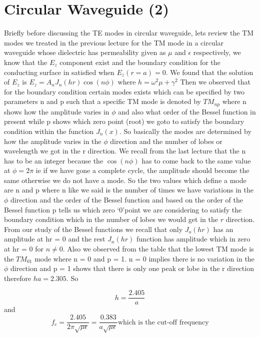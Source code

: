\chapter{Circular Waveguide (2)}\label{lec:lec45}
Briefly  before  discussing the TE modes in circular waveguide, lets review the TM modes we treated in the previous lecture for the TM   mode in a circular waveguide whose dielectric has permeability given as $\mu$ and $\epsilon$ respectively, we know that the $E_z$ component exist and the boundary condition for the conducting surface in satisfied when $E_z(r=a)= 0$. We found that the solution of $E_z$ is $E_z = A_n J_n(hr)\cos(n\phi)$  where $h= \omega^2\mu + \gamma^2$  Then we observed that for the boundary condition certain modes exists which can be specified by two parameters n and p such that a specific TM mode is denoted by $TM_{np}$ where n shows how the amplitude varies in $\phi$ and also what order of the Bessel function in present while p shows which zero point (root) we goto to satisfy the boundary condition within the function $J_n(x)$. So  basically the modes are determined by how the amplitude varies in the $\phi$ direction and the number of lobes or wavelength we got in the r direction. We recall from  the last lecture that the n has to be an integer because the $\cos(n\phi)$ has to come back to the same value at $\phi=2\pi$ ie if we have gone a complete cycle, the amplitude should become the same otherwise we do not have a mode. So the two values which define a mode are n and p where  n like we said is the number of times we have variations in the $\phi$ direction and the order of the Bessel function and based on the order of the Bessel function p tells us which zero \textquoteleft0\textquoteright point we are considering to satisfy the boundary condition which in the number of lobes we would get in the $r$ direction. From our study of the Bessel functions we recall that only $J_o(hr)$ has an amplitude at hr = 0 and the rest $J_n(hr)$ function has amplitude which in zero at hr = 0 for $ n \ne 0$. Also we observed from the table that the lowest TM mode is the $TM_{01}$ mode where n = 0 and p = 1.  n = 0 implies there is no variation in the $\phi$ direction and p = 1 shows that there is only one peak or lobe in the r direction therefore $ha = 2.305$. So

$$ h = \frac{2.405}{a}$$ and $$f_c = \frac{2.405}{2\pi\sqrt{\mu\epsilon}} = \frac{0.383}{a\sqrt{\mu\epsilon}}\text{which is the cut-off frequency}$$

